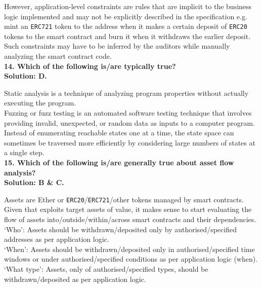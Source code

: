 However, application-level constraints are rules that are implicit to the business logic implemented and may not be explicitly described in the specification e.g. mint an \verb|ERC721| token to the address when it makes a certain deposit of \verb|ERC20| tokens to the smart contract and burn it when it withdraws the earlier deposit.
Such constraints may have to be inferred by the auditors while manually analyzing the smart contract code.\\

\textbf{14. Which of the following is/are typically true?}\label{sec:exam6_q14}\\

\textbf{Solution: D.}

Static analysis is a technique of analyzing program properties without actually executing the program.\\

Fuzzing or fuzz testing is an automated software testing technique that involves providing invalid, unexpected, or random data as inputs to a computer program.\\

Instead of enumerating reachable states one at a time, the state space can sometimes be traversed more efficiently by considering large numbers of states at a single step.\\

\textbf{15. Which of the following is/are generally true about asset flow analysis?}\label{sec:exam6_q15}\\

\textbf{Solution: B \& C.}

Assets are Ether or \verb|ERC20|/\verb|ERC721|/other tokens managed by smart contracts.
Given that exploits target assets of value, it makes sense to start evaluating the flow of assets into/outside/within/across smart contracts and their dependencies.\\

`Who': Assets should be withdrawn/deposited only by authorised/specified addresses as per application logic.\\

`When': Assets should be withdrawn/deposited only in authorised/specified time windows or under authorised/specified conditions as per application logic (when).\\

`What type': Assets, only of authorised/specified types, should be withdrawn/deposited as per application logic.\\

